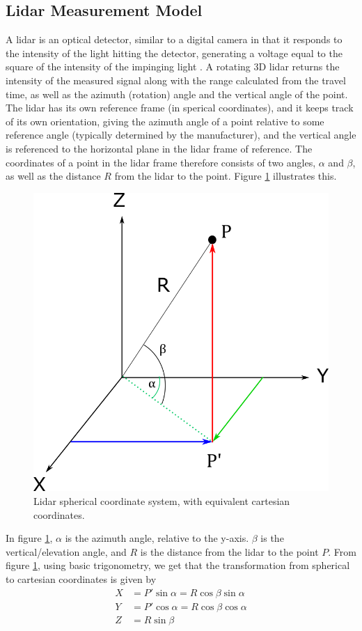 \subsection{Lidar Measurement Model}
A lidar is an optical detector, similar to a digital camera in that it responds to the intensity of the light hitting the detector, generating a voltage equal to the square of the intensity of the impinging light \cite{SpieLidar}. A rotating 3D lidar returns the intensity of the measured signal along with the range calculated from the travel time, as well as the azimuth (rotation) angle and the vertical angle of the point. The lidar has its own reference frame (in sperical coordinates), and it keeps track of its own orientation, giving the azimuth angle of a point relative to some reference angle (typically determined by the manufacturer), and the vertical angle is referenced to the horizontal plane in the lidar frame of reference. The coordinates of a point in the lidar frame therefore consists of two angles, $\alpha$ and $\beta$, as well as the distance $R$ from the lidar to the point. Figure \ref{fig:lidar_spherical} illustrates this.
\begin{figure}[H]
    \centering
    \includegraphics[width=.7\linewidth]{fig/sperical_to_cartesian.png}
    \caption{Lidar spherical coordinate system, with equivalent cartesian coordinates.}
    \label{fig:lidar_spherical}
\end{figure}
In figure \ref{fig:lidar_spherical}, $\alpha$ is the azimuth angle, relative to the y-axis. $\beta$ is the vertical/elevation angle, and $R$ is the distance from the lidar to the point $P$.
From figure \ref{fig:lidar_spherical}, using basic trigonometry, we get that the transformation from spherical to cartesian coordinates is given by
\begin{equation}
    \begin{split}
        X&=P'\sin{\alpha}=R\cos{\beta}\sin{\alpha}\\
        Y&=P'\cos{\alpha}=R\cos{\beta}\cos{\alpha}\\
        Z&=R\sin{\beta}
    \end{split}
\end{equation}
